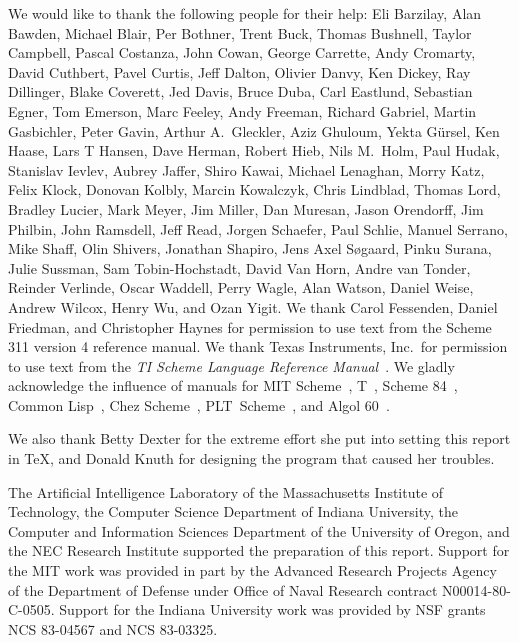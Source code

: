 We would like to thank the following people for their help: Eli
Barzilay, Alan Bawden, Michael
Blair, Per Bothner, Trent Buck, Thomas Bushnell, Taylor Campbell, Pascal Costanza,
John Cowan, George Carrette, Andy Cromarty, David Cuthbert, Pavel Curtis, Jeff Dalton, Olivier Danvy,
Ken Dickey, Ray Dillinger, Blake Coverett, Jed Davis, Bruce Duba, Carl Eastlund,
Sebastian Egner, Tom Emerson, Marc Feeley,
Andy Freeman, Richard Gabriel, Martin Gasbichler, Peter Gavin, Arthur A.\ Gleckler,
Aziz Ghuloum, Yekta G\"ursel, Ken Haase, Lars T Hansen,
Dave Herman, Robert Hieb, Nils M.\ Holm, Paul Hudak, Stanislav Ievlev, Aubrey Jaffer, Shiro Kawai,
Michael Lenaghan, Morry Katz, Felix Klock, Donovan Kolbly,
Marcin Kowalczyk, Chris Lindblad, Thomas Lord, Bradley
Lucier, Mark Meyer, Jim Miller, Dan Muresan, Jason Orendorff, Jim Philbin,
John Ramsdell, Jeff Read, Jorgen Schaefer, Paul Schlie, Manuel Serrano,
Mike Shaff, Olin Shivers, Jonathan Shapiro, Jens Axel S\o{}gaard,
Pinku Surana, Julie Sussman, Sam Tobin-Hochstadt,
David Van Horn, Andre van Tonder, Reinder Verlinde, Oscar Waddell,
Perry Wagle, Alan Watson, Daniel Weise, Andrew Wilcox, Henry Wu,
and Ozan Yigit.
We thank Carol Fessenden, Daniel
Friedman, and Christopher Haynes for permission to use text from the Scheme 311
version 4 reference manual.  We thank Texas Instruments, Inc.~for permission to
use text from the {\em TI Scheme Language Reference Manual}~\cite{TImanual85}.
We gladly acknowledge the influence of manuals for MIT Scheme~\cite{MITScheme},
T~\cite{Rees84}, Scheme 84~\cite{Scheme84}, Common Lisp~\cite{CLtL},
Chez Scheme~\cite{csug7}, PLT~Scheme~\cite{mzscheme352},
and Algol 60~\cite{Naur63}.

\vest We also thank Betty Dexter for the extreme effort she put into
setting this report in \TeX, and Donald Knuth for designing the program
that caused her troubles.

\vest The Artificial Intelligence Laboratory of the
Massachusetts Institute of Technology, the Computer Science
Department of Indiana University, the Computer and Information
Sciences Department of the University of Oregon, and the NEC Research
Institute supported the preparation of this report.  Support for the MIT
work was provided in part by
the Advanced Research Projects Agency of the Department of Defense under Office
of Naval Research contract N00014-80-C-0505.  Support for the Indiana
University work was provided by NSF grants NCS 83-04567 and NCS
83-03325.


